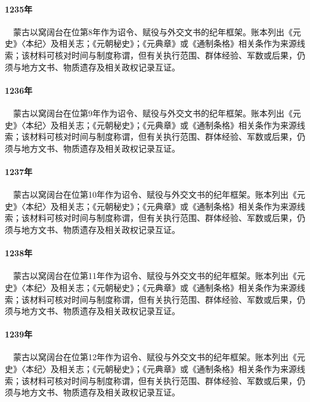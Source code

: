 \paragraph{1235年}　蒙古以窝阔台在位第8年作为诏令、赋役与外交文书的纪年框架。账本列出《元史》〈本纪〉及相关志；《元朝秘史》；《元典章》或《通制条格》相关条作为来源线索；该材料可核对时间与制度称谓，但有关执行范围、群体经验、军数或后果，仍须与地方文书、物质遗存及相关政权记录互证。

\paragraph{1236年}　蒙古以窝阔台在位第9年作为诏令、赋役与外交文书的纪年框架。账本列出《元史》〈本纪〉及相关志；《元朝秘史》；《元典章》或《通制条格》相关条作为来源线索；该材料可核对时间与制度称谓，但有关执行范围、群体经验、军数或后果，仍须与地方文书、物质遗存及相关政权记录互证。

\paragraph{1237年}　蒙古以窝阔台在位第10年作为诏令、赋役与外交文书的纪年框架。账本列出《元史》〈本纪〉及相关志；《元朝秘史》；《元典章》或《通制条格》相关条作为来源线索；该材料可核对时间与制度称谓，但有关执行范围、群体经验、军数或后果，仍须与地方文书、物质遗存及相关政权记录互证。

\paragraph{1238年}　蒙古以窝阔台在位第11年作为诏令、赋役与外交文书的纪年框架。账本列出《元史》〈本纪〉及相关志；《元朝秘史》；《元典章》或《通制条格》相关条作为来源线索；该材料可核对时间与制度称谓，但有关执行范围、群体经验、军数或后果，仍须与地方文书、物质遗存及相关政权记录互证。

\paragraph{1239年}　蒙古以窝阔台在位第12年作为诏令、赋役与外交文书的纪年框架。账本列出《元史》〈本纪〉及相关志；《元朝秘史》；《元典章》或《通制条格》相关条作为来源线索；该材料可核对时间与制度称谓，但有关执行范围、群体经验、军数或后果，仍须与地方文书、物质遗存及相关政权记录互证。


